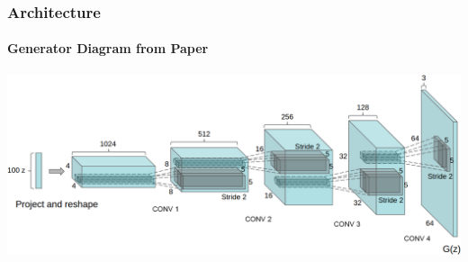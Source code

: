 \documentclass{beamer}
\begin{document}

\begin{frame}
\frametitle{Architecture}
\framesubtitle{Generator Diagram from Paper \cite{repLearnDcgan}}
\includegraphics[scale=0.2]{generator-diagram}
\end{frame}
\end{document}
